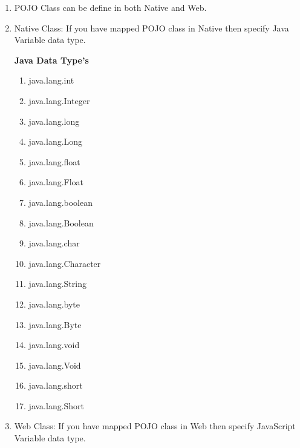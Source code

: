 \begin{enumerate}
\begin{enumerate}
\begin{center}
{{\begin{enumerate}
					\item \small POJO Class can be define in both Native and Web.

					\item \small Native Class: If you have mapped POJO class in Native then specify Java Variable data type.

					\textbf{Java Data Type's}
					\begin{enumerate}

						\item \small java.lang.int

						\item \small java.lang.Integer

						\item \small java.lang.long

						\item \small java.lang.Long

						\item \small java.lang.float

						\item \small java.lang.Float

						\item \small java.lang.boolean

						\item \small java.lang.Boolean

						\item \small java.lang.char

						\item \small java.lang.Character

						\item \small java.lang.String

						\item \small java.lang.byte

						\item \small java.lang.Byte

						\item \small java.lang.void

						\item \small java.lang.Void

						\item \small java.lang.short

						\item \small java.lang.Short

					\end{enumerate} 
						
				
					\item \small Web Class: If you have mapped POJO class in Web then specify JavaScript Variable data type.


\end{enumerate}}}
\end{center}
\end{enumerate}
\end{enumerate}
